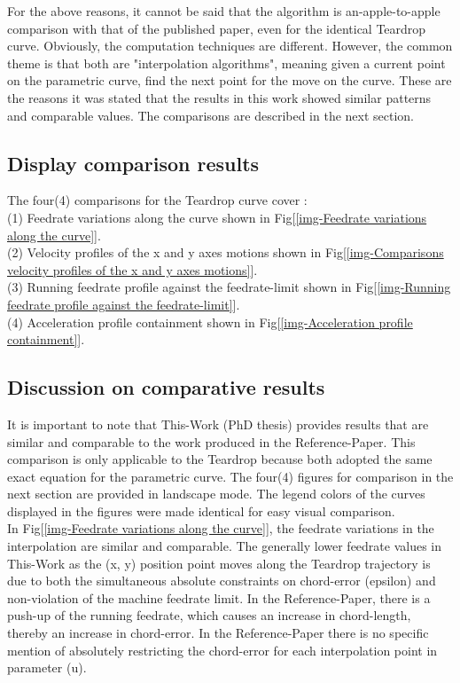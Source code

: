 For the above reasons, it cannot be said that the algorithm is an-apple-to-apple comparison with that of the published paper, even for the identical Teardrop curve. Obviously, the computation techniques are different. However, the common theme is that both are "interpolation algorithms", meaning given a current point on the parametric curve, find the next point for the move on the curve. These are the reasons it was stated that the results in this work showed similar patterns and comparable values. The comparisons are described in the next section.

\clearpage
\pagebreak

\subsection{Display comparison results}

\noindent The four(4) comparisons for the Teardrop curve cover : \\
\noindent 
(1) Feedrate variations along the curve shown in Fig[\ref{img-Feedrate variations along the curve}].\\
(2) Velocity profiles of the x and y axes motions shown in Fig[\ref{img-Comparisons velocity profiles of the x and y axes motions}].\\
(3) Running feedrate profile against the feedrate-limit shown in Fig[\ref{img-Running feedrate profile against the feedrate-limit}].\\  
(4) Acceleration profile containment shown in Fig[\ref{img-Acceleration profile containment}].


\subsection{Discussion on comparative results}

\noindent It is important to note that This-Work (PhD thesis) provides results that are similar and comparable to the work produced in the Reference-Paper. This comparison is only applicable to the Teardrop because both adopted the same exact equation for the parametric curve. The four(4) figures for comparison in the next section are provided in landscape mode. The legend colors of the curves displayed in the figures were made identical for easy visual comparison. \\

\noindent
In Fig[\ref{img-Feedrate variations along the curve}], the feedrate variations in the interpolation are similar and comparable. The generally lower feedrate values in This-Work as the (x, y) position point moves along the Teardrop trajectory is due to both the simultaneous absolute constraints on chord-error (epsilon) and non-violation of the machine feedrate limit. In the Reference-Paper, there is a push-up of the running feedrate, which causes an increase in chord-length, thereby an increase in chord-error. In the Reference-Paper there is no specific mention of absolutely restricting the chord-error for each interpolation point in parameter (u).\\ 

